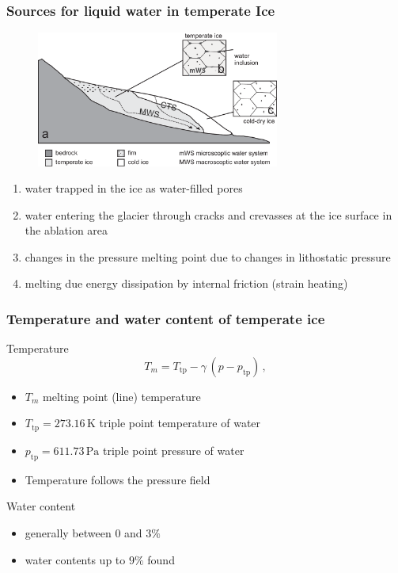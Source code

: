 \documentclass[hide notes,intlimits,unknownkeysallowed]{beamer}
\newcommand{\unit}[1]{\ensuremath{\,\text{#1}}}
\begin{document}
\begin{frame}
  \frametitle{Sources for liquid water in temperate Ice}
  \vspace{-1em}
  \begin{figure}
    \includegraphics[width=8cm]{mws}
  \end{figure}
  \begin{enumerate} \small
  \item water trapped in the ice as water-filled pores
  \item water entering the glacier through cracks and crevasses at the ice surface in the ablation area
  \item changes in the pressure melting point due to changes in lithostatic pressure
  \item melting due energy dissipation by internal friction (strain heating) 
  \end{enumerate}  
\end{frame}




\begin{frame}
  \frametitle{Temperature and water content of temperate ice}
  \begin{block}{Temperature}
    \begin{equation}
      \label{eq:clausius-pure}
      T_m = T_{\text{tp}} - \gamma\, (p - p_{\text{tp}})\,,
    \end{equation}
    \begin{itemize}
    \item $T_m$ \; melting point (line) temperature
    \item $T_{\text{tp}}=273.16\unit{K}$ triple point temperature of water
    \item $p_{\text{tp}}=611.73\unit{Pa}$ triple point pressure of water
    \item Temperature follows the pressure field
    \end{itemize}
  \end{block}
  \begin{block}{Water content}
    \begin{itemize}
    \item generally between 0 and $3\%$
    \item water contents up to $9\%$ found
    \end{itemize}
  \end{block}
\end{frame}
\end{document}
